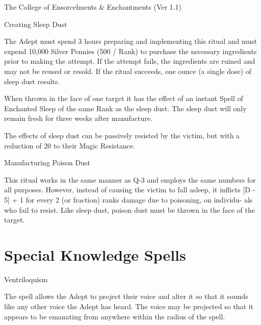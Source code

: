\begin{Chapter}{The College of Ensorcelments \& Enchantments (Ver 1.1)}
\begin{ritual}[Q-3]{Creating Sleep Dust}

\begin{effects}
The Adept must spend 3 hours preparing and implementing this ritual
and must expend 10,000 Silver Pennies (500 / Rank) to purchase the
necessary ingredients prior to making the attempt.  If the attempt
fails, the ingredients are ruined and may not be reused or resold. If
the ritual succeeds, one ounce (a single dose) of sleep dust results.

When thrown in the face of one target it has the effect of an instant
Spell of Enchanted Sleep of the same Rank as the sleep dust.  The
sleep dust will only remain fresh for three weeks after manufacture.

The effects of sleep dust can be passively resisted by the victim, but
with a reduction of 20 to their Magic Resistance.
\end{effects}
\end{ritual}

\begin{ritual}[Q-4]{Manufacturing Poison Dust}
\begin{effects}
This ritual works in the same manner as Q-3 and employs the same
numbers for all purposes.  However, instead of causing the victim to
fall asleep, it inflicts [D - 5] + 1 for every 2 (or fraction) ranks
damage due to poisoning, on individu- als who fail to resist.  Like
sleep dust, poison dust must be thrown in the face of the target.
\end{effects}
\end{ritual}


\section{Special Knowledge Spells}


\begin{spell}[S-1]{Ventriloquism}
\begin{effects}
The spell allows the Adept to project their voice and alter it so that
it sounds like any other voice the Adept has heard. The voice may be
projected so that it appears to be emanating from anywhere within the
radius of the spell.
\end{effects}
\end{spell}


\end{Chapter}
